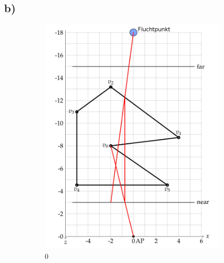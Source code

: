 \documentclass[a4paper,10pt,DIV=14]{article}
\begin{document}
\subsection{b)} 
\begin{figure}[H]
	\captionsetup{justification=centering}
	\begin{subfigure}{0.3\textwidth}
		\includegraphics[width=\textwidth]{2b_0}
		\caption{0}
	\end{subfigure}
	~
	\begin{subfigure}{0.3\textwidth}

\end{subfigure}
\end{figure}
\end{document}
